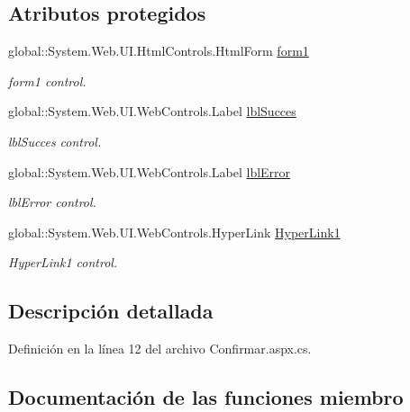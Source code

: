 \subsection*{Atributos protegidos}
\begin{DoxyCompactItemize}
\item 
global\+::\+System.\+Web.\+U\+I.\+Html\+Controls.\+Html\+Form \mbox{\hyperlink{classwebprueba_1_1_confirmar_a4f6e23fc2d700229b3eecbabe696393c}{form1}}
\begin{DoxyCompactList}\small\item\em form1 control. \end{DoxyCompactList}\item 
global\+::\+System.\+Web.\+U\+I.\+Web\+Controls.\+Label \mbox{\hyperlink{classwebprueba_1_1_confirmar_ad8c4c024a1344980ca8d632b482a2691}{lbl\+Succes}}
\begin{DoxyCompactList}\small\item\em lbl\+Succes control. \end{DoxyCompactList}\item 
global\+::\+System.\+Web.\+U\+I.\+Web\+Controls.\+Label \mbox{\hyperlink{classwebprueba_1_1_confirmar_a356770e3d6653a1bfc13c855989a858b}{lbl\+Error}}
\begin{DoxyCompactList}\small\item\em lbl\+Error control. \end{DoxyCompactList}\item 
global\+::\+System.\+Web.\+U\+I.\+Web\+Controls.\+Hyper\+Link \mbox{\hyperlink{classwebprueba_1_1_confirmar_a36dc790fef42876a20f279fac79ec0db}{Hyper\+Link1}}
\begin{DoxyCompactList}\small\item\em Hyper\+Link1 control. \end{DoxyCompactList}\end{DoxyCompactItemize}


\subsection{Descripción detallada}


Definición en la línea 12 del archivo Confirmar.\+aspx.\+cs.



\subsection{Documentación de las funciones miembro}
\mbox{\label{classwebprueba_1_1_confirmar_a6fada9c94bfc49a7b14f0e9572cd3532}} 
